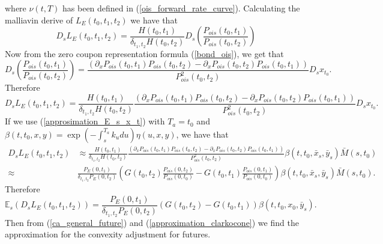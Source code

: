 \documentclass[a4paper,10pt]{article}
\newcommand{\1}{\mathbf{1}}
\begin{document}
where $\nu(t,T)$ has been defined in (\ref{ois_forward_rate_curve}). Calculating the malliavin derive of $L_{E}(t_0,t_1,t_2)$ we have that
\begin{equation*}
D_s L_{E}(t_0,t_1,t_2) = \frac{H(t_0,t_1)}{\delta_{t_1,t_2}H(t_0,t_2)} D_s \left(\frac{P_{ois}(t_0,t_1)}{P_{ois}(t_0,t_2)}\right) 
\end{equation*}
Now from the zero coupon representation formula (\ref{bond_ois}), we get that
\begin{equation*}
D_s \left(\frac{P_{ois}(t_0,t_1)}{P_{ois}(t_0,t_2)}\right) = \frac{\left(\partial_{x}P_{ois}(t_0,t_1)P_{ois}(t_0,t_2) - \partial_{x}P_{ois}(t_0,t_2) P_{ois}(t_0,t_1) \right)}{P^{2}_{ois}(t_0,t_2)} D_s x_{t_0}.
\end{equation*}
Therefore
\begin{equation}\label{malliavin_derive_L}
D_s L_{E}(t_0,t_1,t_2) = \frac{H(t_0,t_1)}{\delta_{t_1,t_2}H(t_0,t_2)}\frac{\left(\partial_{x}P_{ois}(t_0,t_1)P_{ois}(t_0,t_2) - \partial_{x}P_{ois}(t_0,t_2) P_{ois}(t_0,t_1) \right)}{P^{2}_{ois}(t_0,t_2)} D_s x_{t_0}.
\end{equation}
If we use (\ref{approsimation_E_s_x_t}) with $T_a=t_0$ and $\beta(t,t_0,x,y) = \exp\left(-\int_{s}^{T_a}k_u du \right) \eta(u,x,y)$, we have that
\begin{align*}
D_s L_{E}(t_0,t_1,t_2) &\approx \frac{H(t_0,t_1)}{\delta_{t_1,t_2}H(t_0,t_2)}\frac{\left(\partial_{x}P_{ois}(t_0,t_1)P_{ois}(t_0,t_2) - \partial_{x}P_{ois}(t_0,t_2) P_{ois}(t_0,t_1) \right)}{P^{2}_{ois}(t_0,t_2)} \beta(t,t_0,\bar{x}_s,\bar{y}_s)\bar{M}(s,t_0) \nonumber \\
\approx& \frac{P_{E}(0,t_1)}{\delta_{t_1,t_2} P_{E}(0,t_2)} \left(G(t_0,t_2) \frac{P_{ois}(0,t_2)}{P_{ois}(0,t_0)} - G(t_0,t_1) \frac{P_{ois}(0,t_1)}{P_{ois}(0,t_0)} \right)\beta(t,t_0,\bar{x}_s,\bar{y}_s)\bar{M}(s,t_0).
\end{align*}
Therefore
\begin{equation}\label{approximation_clarkocone}
\mathbb{E}_s\left( D_s L_{E}(t_0,t_1,t_2) \right) = \frac{P_{E}(0,t_1)}{\delta_{t_1,t_2} P_{E}(0,t_2)} \left(G(t_0,t_2)  - G(t_0,t_1)\right)\beta(t,t_0,x_0,\bar{y}_s).
\end{equation}
Then from (\ref{ca_general_future}) and (\ref{approximation_clarkocone}) we find the approximation for the convexity adjustment for futures.
\end{document}

